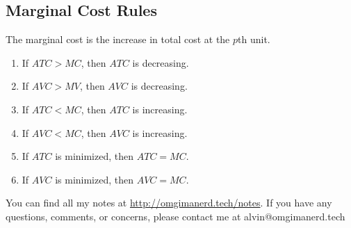 \documentclass[letterpaper, 12pt]{article}
\begin{document}
\subsection{Marginal Cost Rules}
The marginal cost is the increase in total cost at the \( p \)th unit.
\begin{enumerate}
  \item If \( ATC > MC \), then \( ATC \) is decreasing.
  \item If \( AVC > MV \), then \( AVC \) is decreasing.
  \item If \( ATC < MC \), then \( ATC \) is increasing.
  \item If \( AVC < MC \), then \( AVC \) is increasing.
  \item If \( ATC \) is minimized, then \( ATC = MC \).
  \item If \( AVC \) is minimized, then \( AVC = MC \).
\end{enumerate}

\begin{center}
  You can find all my notes at \url{http://omgimanerd.tech/notes}. If you have
  any questions, comments, or concerns, please contact me at
  alvin@omgimanerd.tech
\end{center}
\end{document}
